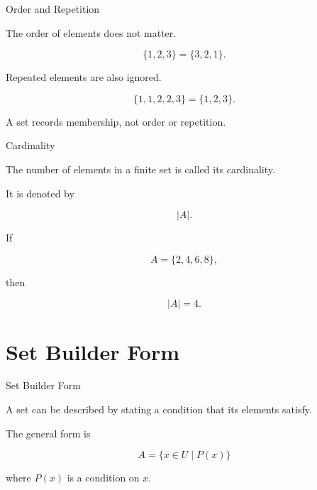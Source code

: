 \documentclass[aspectratio=169,11pt]{beamer}
\begin{document}

\begin{frame}{Order and Repetition}

The order of elements does not matter.

\[
\{1,2,3\}
=
\{3,2,1\}.
\]

\vspace{0.3cm}

Repeated elements are also ignored.

\[
\{1,1,2,2,3\}
=
\{1,2,3\}.
\]

\vspace{0.35cm}

A set records \textcolor{MathGreen}{membership}, not order or repetition.

\end{frame}


\begin{frame}{Cardinality}

The number of elements in a finite set is called its
\textcolor{MathGreen}{cardinality}.

It is denoted by

\[
|A|.
\]

\vspace{0.35cm}

If

\[
A=\{2,4,6,8\},
\]

then

\[
\boxed{|A|=4}.
\]

\end{frame}


\section{Set Builder Form}


\begin{frame}{Set Builder Form}

A set can be described by stating a condition that its
elements satisfy.

\vspace{0.35cm}

The general form is

\[
\boxed{
A=\{x\in U\mid P(x)\}
}
\]

where $P(x)$ is a condition on $x$.

\end{frame}
\end{document}

